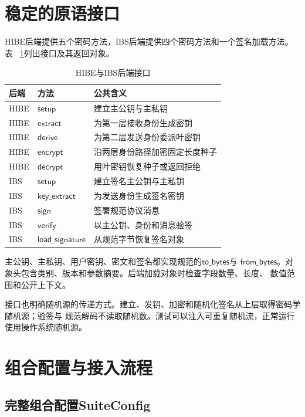 \section{稳定的原语接口}

HIBE后端提供五个密码方法，IBS后端提供四个密码方法和一个签名加载方法。表
~\ref{tab:backend-interfaces}列出接口及其返回对象。

\begin{table}[H]
\centering\small
\caption{HIBE与IBS后端接口}
\label{tab:backend-interfaces}
\begin{tabularx}{\textwidth}{@{}p{}p{}X@{}}
\toprule
\rowcolor{black!8} 后端 & 方法 & 公共含义 \\
\midrule
HIBE & $\mathsf{setup}$ & 建立主公钥与主私钥 \\
HIBE & $\mathsf{extract}$ & 为第一层接收身份生成密钥 \\
HIBE & $\mathsf{derive}$ & 为第二层发送身份委派叶密钥 \\
HIBE & $\mathsf{encrypt}$ & 沿两层身份路径加密固定长度种子 \\
HIBE & $\mathsf{decrypt}$ & 用叶密钥恢复种子或返回拒绝 \\
\midrule
IBS & $\mathsf{setup}$ & 建立签名主公钥与主私钥 \\
IBS & $\mathsf{key\_extract}$ & 为发送身份生成签名密钥 \\
IBS & $\mathsf{sign}$ & 签署规范协议消息 \\
IBS & $\mathsf{verify}$ & 以主公钥、身份和消息验签 \\
IBS & $\mathsf{load\_signature}$ & 从规范字节恢复签名对象 \\
\bottomrule
\end{tabularx}
\end{table}

主公钥、主私钥、用户密钥、密文和签名都实现规范的$\mathsf{to\_bytes}$与
$\mathsf{from\_bytes}$。对象头包含类别、版本和参数摘要。后端加载对象时检查字段数量、长度、
数值范围和公开上下文。

接口也明确随机源的传递方式。建立、发钥、加密和随机化签名从上层取得密码学随机源；验签与
规范解码不读取随机数。测试可以注入可重复随机流，正常运行使用操作系统随机源。

\section{组合配置与接入流程}

\subsection{完整组合配置SuiteConfig}

